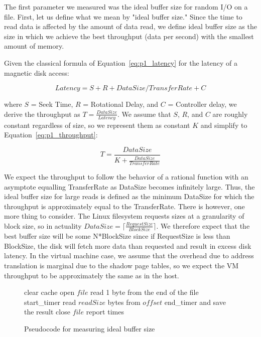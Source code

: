 The first parameter we measured was the ideal buffer size for random I/O 
on a file. First, let us define what we mean by "ideal buffer size." Since
the time to read data is affected by the amount of data read, we define ideal
buffer size as the size in which we achieve the best throughput (data per second)
with the smallest amount of memory. 

Given the classical formula of Equation~\ref{eq:p1_latency} for the latency 
of a magnetic disk access:

\begin{equation}\label{eq:p1_latency}
Latency = S + R + DataSize/TransferRate + C
\end{equation}

where $S$ = Seek Time, $R$ = Rotational Delay, and $C$ = Controller delay, we 
derive the throughput as $T = \frac{DataSize}{Latency}$. We assume that $S$, $R$, 
and $C$ are roughly constant regardless of size, so we represent them as constant 
$K$ and simplify to Equation~\ref{eq:p1_throughput}:

\begin{equation}\label{eq:p1_throughput}
T = \frac{DataSize}{K + \frac{DataSize}{TransferRate}}
\end{equation}

We expect the throughput to follow the behavior of a rational function
with an asymptote equalling TransferRate as DataSize becomes infinitely large.
Thus, the ideal buffer size for large reads is defined as the minimum DataSize for 
which the throughput is approximately equal to the TransferRate. There is however, 
one more thing to consider. The Linux filesystem requests sizes at a granularity of 
block size, so in actuality $DataSize = \lceil\frac{RequestSize}{BlockSize}\rceil$.
We therefore expect that the best buffer size will be some N*BlockSize since
if RequestSize is less than BlockSize, the disk will fetch more data than
requested and result in excess disk latency. In the virtual machine case, we assume 
that the overhead due to address translation is marginal due to the shadow page 
tables, so we expect the VM throughput to be approximately the same as in the host.

\begin{figure}[b]
\begin{algorithmic}
   \STATE clear cache
   \STATE open $file$
   \STATE read 1 byte from the end of the file
   \STATE start\_timer
   \STATE read $readSize$ bytes from $offset$
   \STATE end\_timer and save the result
   \STATE close $file$
   \STATE report times
\ENDFOR
\end{algorithmic}
\caption{Pseudocode for measuring ideal buffer size}
\label{fig:p1code}
\end{figure}


